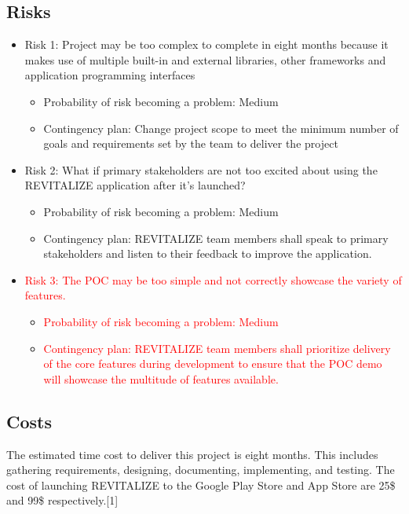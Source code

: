 \documentclass[12pt,letterpaper]{article}
\begin{document}
\subsection{Risks}
\begin{itemize}
	\item Risk 1: Project may be too complex to complete in eight months because it makes use of multiple built-in and external libraries, other frameworks and application programming interfaces
	\begin{itemize}
		\item Probability of risk becoming a problem: Medium
		\item Contingency plan: Change project scope to meet the minimum number of goals and requirements set by the team to deliver the project
	\end{itemize}
	\item Risk 2: What if primary stakeholders are not too excited about using the REVITALIZE application after it's launched?
	\begin{itemize}
		\item Probability of risk becoming a problem: Medium
		\item Contingency plan: REVITALIZE team members shall speak to primary stakeholders and listen to their feedback to improve the application.
	\end{itemize}
\item \textcolor{red}{Risk 3:} \textcolor{red}{The POC may be too simple and not correctly showcase the variety of features.}
\begin{itemize}
\item \textcolor{red}{Probability of risk becoming a problem:} \textcolor{red}{Medium}
\item \textcolor{red}{Contingency plan:} \textcolor{red}{REVITALIZE team members shall prioritize delivery of the core features during development to ensure that the POC demo will showcase the multitude of features available.}
\end{itemize}
\end{itemize}

\subsection{Costs}
The estimated time cost to deliver this project is eight months. This includes gathering requirements, designing, documenting, implementing, and testing. The cost of launching REVITALIZE to the Google Play Store and App Store are 25\$ and 99\$ respectively.[1]
\end{document}

